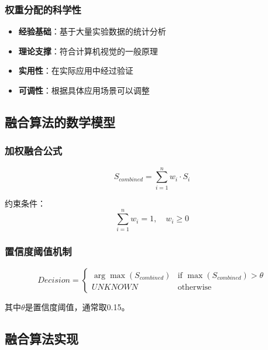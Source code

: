 \documentclass[12pt]{article}
\begin{document}
\subsubsection{权重分配的科学性}

\begin{itemize}
    \item \textbf{经验基础}：基于大量实验数据的统计分析
    \item \textbf{理论支撑}：符合计算机视觉的一般原理
    \item \textbf{实用性}：在实际应用中经过验证
    \item \textbf{可调性}：根据具体应用场景可以调整
\end{itemize}

\subsection{融合算法的数学模型}

\subsubsection{加权融合公式}

\begin{equation}
S_{combined} = \sum_{i=1}^{n} w_i \cdot S_i
\end{equation}

约束条件：
\begin{equation}
\sum_{i=1}^{n} w_i = 1, \quad w_i \geq 0
\end{equation}

\subsubsection{置信度阈值机制}

\begin{equation}
Decision = \begin{cases}
\arg\max(S_{combined}) & \text{if } \max(S_{combined}) > \theta \\
UNKNOWN & \text{otherwise}
\end{cases}
\end{equation}

其中$\theta$是置信度阈值，通常取0.15。

\subsection{融合算法实现}
\end{document}
